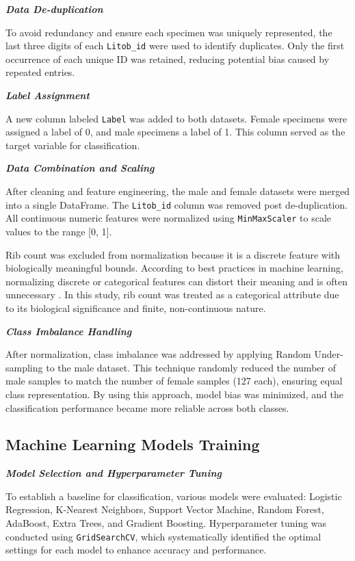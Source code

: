 \textbf{\textit{Data De-duplication}}

To avoid redundancy and ensure each specimen was uniquely represented, the last three digits of each \texttt{Litob\_id} were used to identify duplicates. Only the first occurrence of each unique ID was retained, reducing potential bias caused by repeated entries.

\newpage
\textbf{\textit{Label Assignment}}

A new column labeled \texttt{Label} was added to both datasets. Female specimens were assigned a label of 0, and male specimens a label of 1. This column served as the target variable for classification.

\textbf{\textit{Data Combination and Scaling}}

After cleaning and feature engineering, the male and female datasets were merged into a single DataFrame. The \texttt{Litob\_id} column was removed post de-duplication. All continuous numeric features were normalized using \texttt{MinMaxScaler} to scale values to the range [0, 1].

Rib count was excluded from normalization because it is a discrete feature with biologically meaningful bounds. According to best practices in machine learning, normalizing discrete or categorical features can distort their meaning and is often unnecessary \cite{jaiswal2024}. In this study, rib count was treated as a categorical attribute due to its biological significance and finite, non-continuous nature.

\textbf{\textit{Class Imbalance Handling}}

After normalization, class imbalance was addressed by applying Random Under-sampling to the male dataset. This technique randomly reduced the number of male samples to match the number of female samples (127 each), ensuring equal class representation. By using this approach, model bias was minimized, and the classification performance became more reliable across both classes.

\subsection{Machine Learning Models Training}

\textbf{\textit{Model Selection and Hyperparameter Tuning}}

To establish a baseline for classification, various models were evaluated: Logistic Regression, K-Nearest Neighbors, Support Vector Machine, Random Forest, AdaBoost, Extra Trees, and Gradient Boosting. Hyperparameter tuning was conducted using \texttt{GridSearchCV}, which systematically identified the optimal settings for each model to enhance accuracy and performance.

